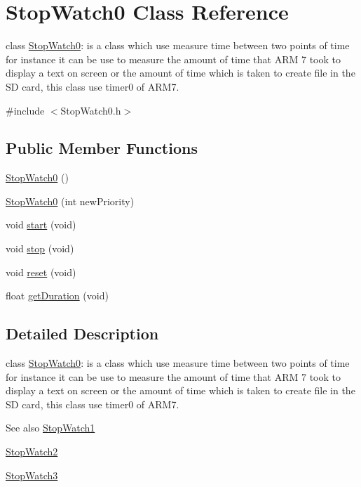\hypertarget{class_stop_watch0}{
\section{StopWatch0 Class Reference}
\label{d6/da1/class_stop_watch0}
}


class \hyperlink{class_stop_watch0}{StopWatch0}: is a class which use measure time between two points of time for instance it can be use to measure the amount of time that ARM 7 took to display a text on screen or the amount of time which is taken to create file in the SD card, this class use timer0 of ARM7.  




{\ttfamily \#include $<$StopWatch0.h$>$}

\subsection*{Public Member Functions}
\begin{DoxyCompactItemize}
\item 
\hyperlink{class_stop_watch0_a400c08cdf400f11f37320533a76c8bba}{StopWatch0} ()
\item 
\hyperlink{class_stop_watch0_a15913e022f1981ad4b84f0e417461edc}{StopWatch0} (int newPriority)
\item 
void \hyperlink{class_stop_watch0_ad7ae4c58ef2769776c5b5dd3f6b6c244}{start} (void)
\item 
void \hyperlink{class_stop_watch0_a0162158cbd2d6a755ef80998612ffe0f}{stop} (void)
\item 
void \hyperlink{class_stop_watch0_aff26b9ae9e3fa43088e577c414b4245e}{reset} (void)
\item 
float \hyperlink{class_stop_watch0_ae0474dfaf94bb5bb1f2389e18ca7cd34}{getDuration} (void)
\end{DoxyCompactItemize}


\subsection{Detailed Description}
class \hyperlink{class_stop_watch0}{StopWatch0}: is a class which use measure time between two points of time for instance it can be use to measure the amount of time that ARM 7 took to display a text on screen or the amount of time which is taken to create file in the SD card, this class use timer0 of ARM7. 

\begin{DoxySeeAlso}{See also}
\hyperlink{class_stop_watch1}{StopWatch1} 

\hyperlink{class_stop_watch2}{StopWatch2} 

\hyperlink{class_stop_watch3}{StopWatch3} 
\end{DoxySeeAlso}


